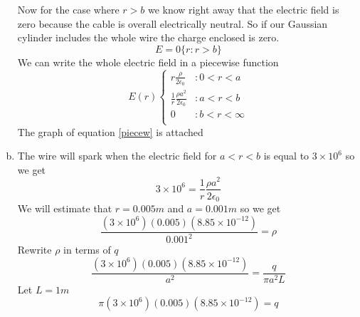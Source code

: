 \documentclass[11pt]{article}
\numberwithin{equation}{section}
\begin{document}
\begin{enumerate}[(a)]
Now for the case where $r>b$ we know right away that the electric field is zero because the cable is overall electrically neutral. So if our Gaussian cylinder includes the whole wire the charge enclosed is zero. 
$$E = 0 \{r:r>b\}$$
We can write the whole electric field in a piecewise function
\begin{equation}
E(r)\left\{
     \begin{array}{lr}
       r\frac{\rho}{2\epsilon_0} & : 0<r<a\\
       \frac{1}{r}\frac{\rho a^2}{2\epsilon_0} & : a<r<b\\
       0 & : b<r<\infty\\
     \end{array}
   \right.
\label{piecew}
\end{equation}
The graph of equation \ref{piecew} is attached
\item 
The wire will spark when the electric field for $a<r<b$ is equal to $3\times 10^6$ so we get
$$3\times 10^6 = \frac{1}{r}\frac{\rho a^2}{2\epsilon_0}$$
We will estimate that $r=0.005 m$ and $a=0.001 m$ so we get
$$\frac{(3\times 10^6)(0.005)(8.85\times10^{-12})}{0.001^2} = \rho$$
Rewrite $\rho$ in terms of $q$
$$\frac{(3\times 10^6)(0.005)(8.85\times10^{-12})}{a^2} = \frac{q}{\pi a^2 L}$$
Let $L = 1m$
$$\pi(3\times 10^6)(0.005)(8.85\times10^{-12}) = q$$
\begin{center}
\end{center}

\end{enumerate}
\end{document}

